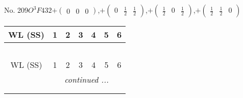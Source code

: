 \documentclass[fleqn,9pt,landscape]{jsarticle}
\begin{document}
\newpage
No. 209\quad$O_{}^{3}$\quad$F432$\quad[ cubic ]\quad$+\begin{pmatrix} 0 & 0 & 0 \end{pmatrix}$,\quad $+\begin{pmatrix} 0 & \frac{1}{2} & \frac{1}{2} \end{pmatrix}$,\quad $+\begin{pmatrix} \frac{1}{2} & 0 & \frac{1}{2} \end{pmatrix}$,\quad $+\begin{pmatrix} \frac{1}{2} & \frac{1}{2} & 0 \end{pmatrix}$
\begin{center}
\renewcommand{\arraystretch}{1.2}
\begin{longtable}{ccccccc}
 \hline \hline
WL (SS) & 1 & 2 & 3 & 4 & 5 & 6 \\ \hline \endfirsthead

\multicolumn{6}{l}{\tablename\ \thetable{}} \\
 \hline \hline
WL (SS) & 1 & 2 & 3 & 4 & 5 & 6 \\ \hline \endhead

 \hline \hline
\multicolumn{6}{r}{\footnotesize\it continued ...} \\ \endfoot

 \hline \hline
\multicolumn{6}{r}{} \\ \endlastfoot


\end{longtable}
\end{center}
\end{document}
